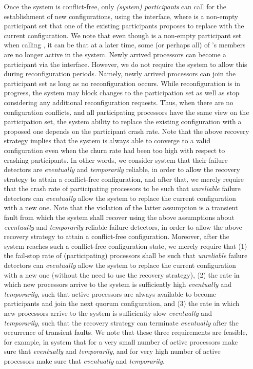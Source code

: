 \documentclass[11pt]{article}
\begin{document}
{Once the system is conflict-free, only \emph{(system) participants} can call for the establishment of new configurations, using the  interface, where  is a non-empty participant set that one of the existing participants proposes to replace with the current configuration. We note that even though  is a non-empty participant set when calling , it can be that at a later time, some (or perhaps all) of 's members are no longer active in the system. Newly arrived processors can become a participant via the  interface. However, we do not require the system to allow this during reconfiguration periods. Namely, newly arrived processors can join the participant set as long as no reconfiguration occurs. While reconfiguration is in progress, the system may block changes to the participation set as well as stop considering any additional reconfiguration requests. Thus, when there are no configuration conflicts, and all participating processors have the same view on the participation set, the system ability to replace the existing configuration with a proposed one depends on the participant crash rate. Note that the above recovery strategy implies that the system is always able to converge to a valid configuration even when the churn rate had been too high with respect to crashing participants. In other words, we consider system that their failure detectors are \emph{eventually} and \emph{temporarily} reliable, in order to allow the recovery strategy to attain a conflict-free configuration, and after that, we merely require that the crash rate of participating processors to be such that \emph{unreliable} failure detectors can \emph{eventually} allow the system to replace the current configuration with a new one. Note that the violation of the latter assumption is a transient fault from which the system shall recover using the above assumptions about \emph{eventually} and \emph{temporarily} reliable failure detectors, in order to allow the above recovery strategy to attain a conflict-free configuration. Moreover, after the system reaches such a conflict-free configuration state, we merely require that (1) the fail-stop rate  of (participating) processors shall be such that \emph{unreliable} failure detectors can \emph{eventually} allow the system to replace the current configuration with a new one (without the need to use the recovery strategy), (2) the rate  in which new processors arrive to the system is sufficiently high \emph{eventually} and \emph{temporarily}, such that active processors are always available to become participants and join the next quorum configuration, and (3) the rate  in which new processors arrive to the system is sufficiently slow \emph{eventually} and \emph{temporarily}, such that the recovery strategy can terminate \emph{eventually} after the occurrence of transient faults. We note that these three requirements are feasible, for example, in system that for a very small number of active processors make sure that  \emph{eventually} and \emph{temporarily}, and for very high number of active processors make sure that  \emph{eventually} and \emph{temporarily}.

} 
\end{document}
